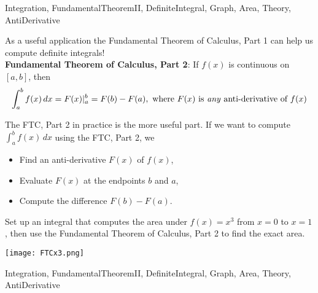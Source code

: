 \begin{tagblock}{Integration, FundamentalTheoremII, DefiniteIntegral, Graph, Area, Theory, AntiDerivative }
\begin{question}

As a useful application the Fundamental Theorem of Calculus, Part 1 can help us compute definite integrals!\\

\textbf{Fundamental Theorem of Calculus, Part 2}:  If $f(x)$ is continuous on $[a,b]$, then 
\[ \int_a^b f(x) \, dx = F(x) |_a^b = F(b) - F(a), \text{ where $F(x)$ is \emph{any} anti-derivative of $f(x)$} \]

The FTC, Part 2 in practice is the more useful part.  If we want to compute $\displaystyle  \int_a^b f(x) \, dx$ using the FTC, Part 2, we 
\begin{itemize}  
\item Find an anti-derivative $F(x)$ of $f(x)$,
\item Evaluate $F(x)$ at the endpoints $b$ and $a$,
\item Compute the difference $F(b) - F(a)$.
\end{itemize}


Set up an integral that computes the area under $f(x)=x^3$ from $x=0$ to $x=1$, then use the Fundamental Theorem of Calculus, Part 2 to find the exact area.  

\texttt{[image: FTCx3.png]}


	
	
\begin{tags}
	   Integration, FundamentalTheoremII, DefiniteIntegral, Graph, Area, Theory, AntiDerivative
\end{tags}
	
\begin{diary}
\end{diary}
	
\begin{solution}
	   
	    \end{enumerate}
\end{solution}
	
\end{question}

\end{tagblock}

